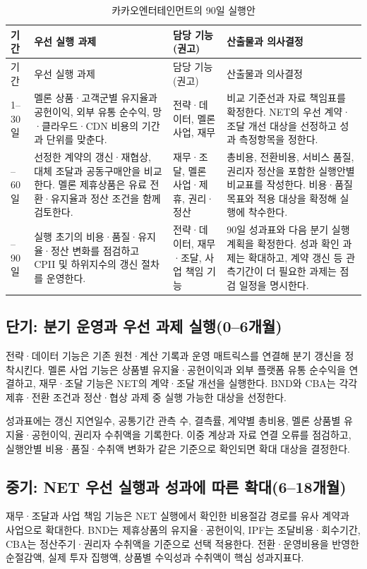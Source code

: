 \documentclass[11pt,a4paper]{report}
\begin{document}
\begingroup
\small
\setlength{\tabcolsep}{4pt}
\begin{longtable}{L{1.6cm}L{4.5cm}L{2.9cm}L{5.6cm}}
\caption{카카오엔터테인먼트의 90일 실행안}\label{tab:kakao_90day_plan}\\
\toprule
{}
기간 & 우선 실행 과제 & 담당 기능(권고) & 산출물과 의사결정 \\
\midrule
\endfirsthead
\toprule
{}
기간 & 우선 실행 과제 & 담당 기능(권고) & 산출물과 의사결정 \\
\midrule
{}--30일 & 멜론 상품·고객군별 유지율과 공헌이익, 외부 유통 순수익, 망·클라우드·CDN 비용의 기간과 단위를 맞춘다. & 전략·데이터, 멜론 사업, 재무 & 비교 기준선과 자료 책임표를 확정한다. NET의 우선 계약·조달 개선 대상을 선정하고 성과 측정항목을 정한다. \\
--60일 & 선정한 계약의 갱신·재협상, 대체 조달과 공동구매안을 비교한다. 멜론 제휴상품은 유료 전환·유지율과 정산 조건을 함께 검토한다. & 재무·조달, 멜론 사업·제휴, 권리·정산 & 총비용, 전환비용, 서비스 품질, 권리자 정산을 포함한 실행안별 비교표를 작성한다. 비용·품질 목표와 적용 대상을 확정해 실행에 착수한다. \\
--90일 & 실행 초기의 비용·품질·유지율·정산 변화를 점검하고 CPII 및 하위지수의 갱신 절차를 운영한다. & 전략·데이터, 재무·조달, 사업 책임 기능 & 90일 성과표와 다음 분기 실행계획을 확정한다. 성과 확인 과제는 확대하고, 계약 갱신 등 관측기간이 더 필요한 과제는 점검 일정을 명시한다. \\
\bottomrule
\end{longtable}
\endgroup

\subsection{단기: 분기 운영과 우선 과제 실행(0--6개월)}
전략·데이터 기능은 기존 원천·계산 기록과 운영 매트릭스를 연결해 분기 갱신을 정착시킨다. 멜론 사업 기능은 상품별 유지율·공헌이익과 외부 플랫폼 유통 순수익을 연결하고, 재무·조달 기능은 NET의 계약·조달 개선을 실행한다. BND와 CBA는 각각 제휴·전환 조건과 정산·협상 과제 중 실행 가능한 대상을 선정한다.

성과표에는 갱신 지연일수, 공통기간 관측 수, 결측률, 계약별 총비용, 멜론 상품별 유지율·공헌이익, 권리자 수취액을 기록한다. 이중 계상과 자료 연결 오류를 점검하고, 실행안별 비용·품질·수취액 변화가 같은 기준으로 확인되면 확대 대상을 결정한다.

\clearpage
\subsection{중기: NET 우선 실행과 성과에 따른 확대(6--18개월)}
재무·조달과 사업 책임 기능은 NET 실행에서 확인한 비용절감 경로를 유사 계약과 사업으로 확대한다. BND는 제휴상품의 유지율·공헌이익, IPF는 조달비용·회수기간, CBA는 정산주기·권리자 수취액을 기준으로 선택 적용한다. 전환·운영비용을 반영한 순절감액, 실제 투자 집행액, 상품별 수익성과 수취액이 핵심 성과지표다.
\end{document}
